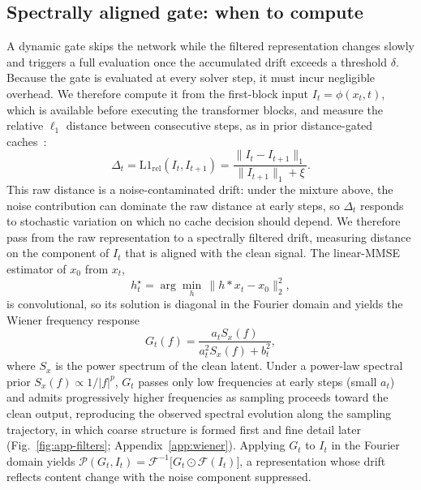 \documentclass{article} %
\begin{document}
\subsection{Spectrally aligned gate: when to compute}
\label{sec:gate}
A dynamic gate skips the network while the filtered representation
changes slowly and triggers a full evaluation once the accumulated
drift exceeds a threshold $\delta$. Because the gate is evaluated at
every solver step, it must incur negligible overhead. We therefore
compute it from the first-block input $I_t = \phi(x_t, t)$, which is
available before executing the transformer blocks, and measure the
relative $\ell_1$ distance between consecutive steps, as in prior
distance-gated caches~\citep{teacache}:
\begin{equation}
  \Delta_t = \mathrm{L1}_{\mathrm{rel}}(I_t, I_{t+1})
  = \frac{\|I_t - I_{t+1}\|_1}{\|I_{t+1}\|_1 + \xi}.
\end{equation}
This raw distance is a noise-contaminated drift: under the mixture
above, the noise contribution can dominate the raw distance at early
steps, so $\Delta_t$ responds to stochastic variation on which no cache
decision should depend. We therefore pass from the raw representation
to a spectrally filtered drift, measuring distance on the component of
$I_t$ that is aligned with the clean signal. The linear-MMSE estimator
of $x_0$ from $x_t$,
\begin{equation}
 h_t^\star = \arg\min_h\, \|h \ast x_t - x_0\|_2^2,
  \label{eq:mmse}
\end{equation}
is convolutional, so its solution is diagonal in the Fourier domain and
yields the Wiener frequency response
\begin{equation}
  G_t(f) = \frac{a_t S_x(f)}{a_t^2 S_x(f) + b_t^2},
  \label{eq:wiener}
\end{equation}
where $S_x$ is the power spectrum of the clean latent. Under a
power-law spectral prior $S_x(f) \propto 1/|f|^p$, $G_t$ passes only
low frequencies at early steps (small $a_t$) and admits progressively
higher frequencies as sampling proceeds toward the clean output,
reproducing the observed spectral evolution along the sampling
trajectory, in which coarse structure is formed first and fine detail
later (Fig.~\ref{fig:app-filters}; Appendix~\ref{app:wiener}). Applying
$G_t$ to $I_t$ in the Fourier domain yields
$\mathcal{P}(G_t, I_t)
= \mathcal{F}^{-1}\!\big[G_t \odot \mathcal{F}(I_t)\big]$,
a representation whose drift reflects content change with the noise
component suppressed.
\end{document}
